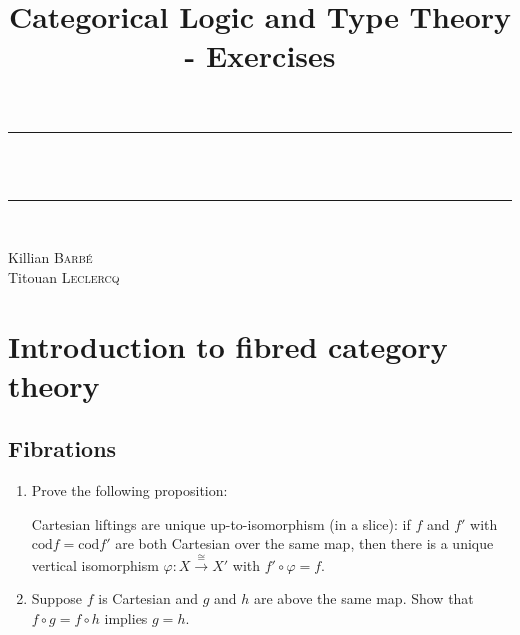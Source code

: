 \documentclass{report}
\title{Categorical Logic and Type Theory - Exercises}
\newcommand{\cod}[0]{\mathrm{cod}}
\begin{document}
\hypersetup{pageanchor=false}
\begin{titlepage}
\pagestyle{empty}
\makeatletter
\begin{center}

    \vspace*{\fill}

    \rule{\linewidth}{0.5mm} \\[0.4cm]
    {\huge \bfseries \@title}\\[0.1cm]
    \rule{\linewidth}{0.5mm} \\[0.4cm]

    \begin{center} \large
        Killian \textsc{Barbé}\\
        Titouan \textsc{Leclercq}
    \end{center}
    \vspace*{\fill}
\end{center}
\makeatother
\end{titlepage}

\newpage
\hypersetup{pageanchor=true}
\pagestyle{main}
\setcounter{page}{1}

\section{Introduction to fibred category theory}

\subsection{Fibrations}

\begin{exo}[]
    \begin{enumerate}[label=(\roman*)]
        \item Prove the following proposition:

        Cartesian liftings are unique up-to-isomorphism (in a slice): if $f$ and $f'$ with $\cod f =
        \cod f'$ are both Cartesian over the same map, then there is a unique vertical isomorphism
        $\varphi : X \overset{\cong}{\to} X'$ with $f'\circ\varphi = f$.
        \item Suppose $f$ is Cartesian and $g$ and $h$ are above the same map. Show that $f\circ g = f
        \circ h$ implies $g = h$.
    \end{enumerate}
\end{exo}
\end{document}
